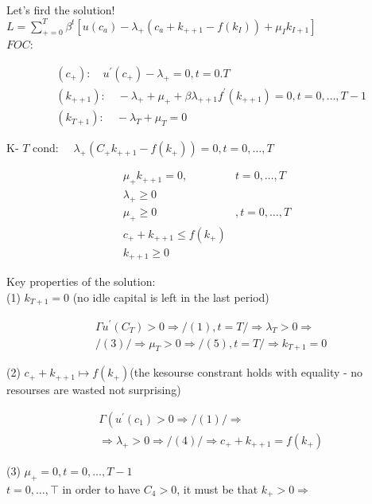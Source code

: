 \documentclass[10pt]{article}
\begin{document}
Let's fird the solution!\\
$L=\sum_{+=0}^{T} \beta^{t}\left[u\left(c_{a}\right)-\lambda_{+}\left(c_{a}+k_{++1}-f\left(k_{I}\right)\right)+\mu_{I} k_{I+1}\right]$\\
$F O C:$


\begin{align*}
& \left(c_{+}\right): \quad u^{\prime}\left(c_{+}\right)-\lambda_{+}=0, t=0 . T  \tag{1}\\
& \left(k_{++1}\right): \quad-\lambda_{+}+\mu_{+}+\beta \lambda_{++1} f^{\prime}\left(k_{++1}\right)=0, t=0, \ldots, T-1  \tag{12)}\\
& \left(k_{T+1}\right): \quad-\lambda_{T}+\mu_{T}=0 \tag{3}
\end{align*}


K- $T$ cond: $\quad \lambda_{+}\left(C_{+} k_{++1}-f\left(k_{+}\right)\right)=0, t=0, \ldots, T$

\[
\begin{array}{ll}
\mu_{+} k_{++1}=0, & t=0, \ldots, T  \tag{5}\\
\lambda_{+} \geqslant 0 & \\
\mu_{+} \geqslant 0 & , t=0, \ldots, T \\
c_{+}+k_{++1} \leqslant f\left(k_{+}\right) & \\
k_{++1} \geqslant 0 &
\end{array}
\]

Key properties of the solution:\\
(1) $k_{T+1}=0$ (no idle capital is left in the last period)

$$
\begin{aligned}
& \Gamma u^{\prime}\left(C_{T}\right)>0 \Rightarrow /(1), t=T / \Rightarrow \lambda_{T}>0 \Rightarrow \\
& /(3) / \Rightarrow \mu_{T}>0 \Rightarrow /(5), t=T / \Rightarrow k_{T+1}=0
\end{aligned}
$$

(2) $c_{+}+k_{++1} \mapsto f\left(k_{+}\right)$(the kesourse constrant holds with equality - no resourses are wasted not surprising)

$$
\begin{aligned}
& \Gamma\left(u^{\prime}\left(c_{1}\right)>0 \Rightarrow /(1) / \Rightarrow\right. \\
& \Rightarrow \lambda_{+}>0 \Rightarrow /(4) / \Rightarrow c_{+}+k_{++1}=f\left(k_{+}\right)
\end{aligned}
$$

(3) $\mu_{+}=0, t=0, \ldots, T-1$\\
$t=0, \ldots, \top$ in order to have $C_{4}>0$, it must be that $k_{+}>0 \Rightarrow$
\end{document}
